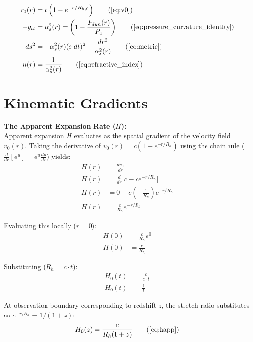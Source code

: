 \begin{tcolorbox}[recallbox, title={\ref{box:gr_bridge}. The Geometric Spacetime Bridge}]
\begin{align}
    v_0(r) &= c\left(1-e^{-r/R_{h,0}}\right) \tag{\ref{eq:v0}} \\
    -g_{tt} &= \alpha_s^2(r) = \left( 1 - \frac{P_{dyn}(r)}{P_c} \right) \tag{\ref{eq:pressure_curvature_identity}} \\
    ds^2 &= -\alpha_s^2(r)(c~dt)^2 + \frac{dr^2}{\alpha_s^2(r)} \tag{\ref{eq:metric}} \\
    n(r) &= \frac{1}{\alpha_s^2(r)} \tag{\ref{eq:refractive_index}}
\end{align}
\end{tcolorbox}

\section{Kinematic Gradients}
\label{sec:deriv_kinematic_gradients}
\textbf{The Apparent Expansion Rate ($H$):} \\ 
Apparent expansion $H$ evaluates as the spatial gradient of the velocity field $v_0(r)$. Taking the derivative of $v_0(r) = c(1 - e^{-r/R_{h}})$ using the chain rule ($\frac{d}{dr}[e^u] = e^u \frac{du}{dr}$) yields:
\begin{align}
    H(r) &= \frac{dv_0}{dr} \\
    H(r) &= \frac{d}{dr} \Big[ c - c e^{-r/R_{h}} \Big] \\
    H(r) &= 0 - c \left( -\frac{1}{R_{h}} \right) e^{-r/R_{h}} \\
    H(r) &= \frac{c}{R_{h}} e^{-r/R_{h}}
\end{align}

Evaluating this locally ($r = 0$):
\begin{align}
    H(0) &= \frac{c}{R_{h}} e^0 \\
    H(0) &= \frac{c}{R_{h}}
\end{align}

Substituting ($R_{h} = c \cdot t$):
\begin{align}
    H_0(t) &= \frac{c}{c \cdot t} \\
    H_0(t) &= \frac{1}{t}
\end{align}

At observation boundary corresponding to redshift $z$, the stretch ratio substitutes as $e^{-r/R_{h}} = 1/(1+z)$: 
\begin{equation}
    H_0(z) = \frac{c}{R_{h}(1+z)} \tag{\ref{eq:happ}}
\end{equation}

